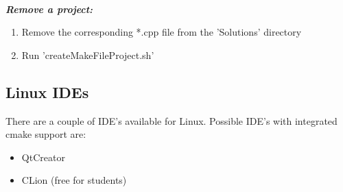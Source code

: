\documentclass[]{article}
\begin{document}
\mbox{} \\
\textit{\textbf{Remove a project:}}
\begin{enumerate}
\item Remove the corresponding *.cpp file from the 'Solutions' directory
\item Run 'createMakeFileProject.sh' 
\end{enumerate}

\subsection{Linux IDEs}

There are a couple of IDE's available for Linux. Possible IDE's with integrated cmake support are: 
\begin{itemize}
\item QtCreator
\item CLion (free for students)
\end{itemize}
\end{document}
